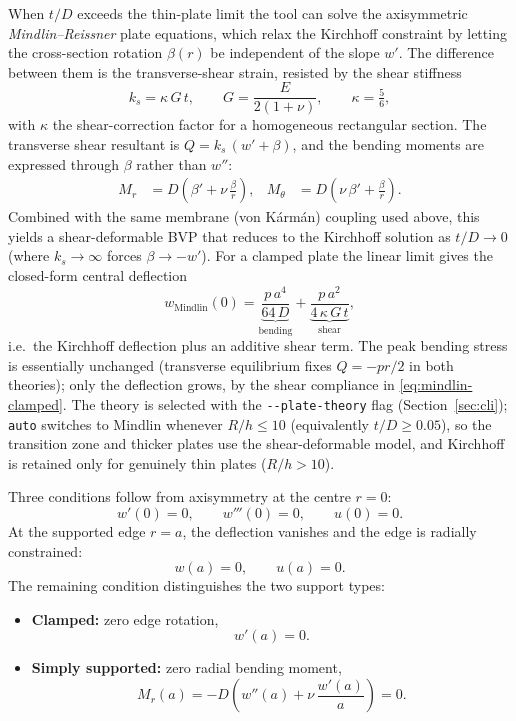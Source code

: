 \documentclass[11pt]{article}
\newcommand{\codeus}{\textunderscore\allowbreak}
\DeclareRobustCommand{\code}[1]{\texttt{\ifmmode\else\renewcommand{\_}{\codeus}\fi#1}}
\begin{document}
When $t/D$ exceeds the thin-plate limit the tool can solve the axisymmetric
\emph{Mindlin--Reissner} plate equations, which relax the Kirchhoff constraint by
letting the cross-section rotation $\beta(r)$ be independent of the slope $w'$.
The difference between them is the transverse-shear strain, resisted by the shear
stiffness
%
\begin{equation}
  k_{s} = \kappa\,G\,t, \qquad
  G = \frac{E}{2(1+\nu)}, \qquad
  \kappa = \tfrac{5}{6},
\end{equation}
%
with $\kappa$ the shear-correction factor for a homogeneous rectangular section.
The transverse shear resultant is $Q = k_{s}\,(w' + \beta)$, and the bending
moments are expressed through $\beta$ rather than $w''$:
%
\begin{align}
  M_{r} &= D\left( \beta' + \nu\,\frac{\beta}{r} \right), &
  M_{\theta} &= D\left( \nu\,\beta' + \frac{\beta}{r} \right).
\end{align}
%
Combined with the same membrane (von K\'arm\'an) coupling used above, this yields
a shear-deformable BVP that reduces to the Kirchhoff solution as $t/D \to 0$
(where $k_{s} \to \infty$ forces $\beta \to -w'$). For a clamped plate the linear
limit gives the closed-form central deflection
%
\begin{equation}
  w_{\mathrm{Mindlin}}(0) = \underbrace{\frac{p\,a^{4}}{64\,D}}_{\text{bending}}
  + \underbrace{\frac{p\,a^{2}}{4\,\kappa\,G\,t}}_{\text{shear}},
  \label{eq:mindlin-clamped}
\end{equation}
%
i.e.\ the Kirchhoff deflection plus an additive shear term. The peak bending
stress is essentially unchanged (transverse equilibrium fixes $Q=-pr/2$ in both
theories); only the deflection grows, by the shear compliance in
\eqref{eq:mindlin-clamped}. The theory is selected with the
\code{-{}-plate-theory} flag (Section~\ref{sec:cli}); \code{auto} switches to
Mindlin whenever $R/h \le 10$ (equivalently $t/D \ge 0.05$), so the transition
zone and thicker plates use the shear-deformable model, and Kirchhoff is retained
only for genuinely thin plates ($R/h > 10$).



Three conditions follow from axisymmetry at the centre $r=0$:
%
\begin{equation}
  w'(0) = 0, \qquad w'''(0) = 0, \qquad u(0) = 0.
\end{equation}
%
At the supported edge $r=a$, the deflection vanishes and the edge is radially
constrained:
%
\begin{equation}
  w(a) = 0, \qquad u(a) = 0.
\end{equation}
%
The remaining condition distinguishes the two support types:
%
\begin{itemize}
  \item \textbf{Clamped:} zero edge rotation,
  \begin{equation}
    w'(a) = 0.
  \end{equation}
  \item \textbf{Simply supported:} zero radial bending moment,
  \begin{equation}
    M_{r}(a) = -D\left( w''(a) + \nu\,\frac{w'(a)}{a} \right) = 0.
  \end{equation}
\end{itemize}
\end{document}

